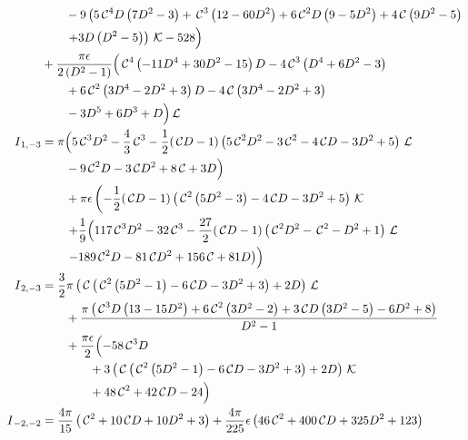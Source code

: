 \documentclass[prd,preprintnumbers,nofootinbib,superscriptaddress,onecolumn,preprint]{revtex4-1}
\newcommand\3[1]{\boldsymbol{#1}}
\newcommand{\cosfun}{\ensuremath{\mathcal{ \, C}}}
\newcommand{\llun}{\ensuremath{ \mathcal{\, L}}}
\newcommand{\kkun}{\ensuremath{ \mathcal{\, K}}}
\begin{document}
\begin{align}
                &{} \qquad  - 9 \left(5 \cosfun^4 D \left(7 D^2-3\right)+\cosfun^3 \left(12-60 D^2\right) + 6 \cosfun^2 D \left(9-5 D^2\right)+4 \cosfun \left(9 D^2-5\right)  \right. \nonumber \\  
                &{} \qquad \left. +3 D \left(D^2-5\right)\right) \kkun-528 \Bigr) \nonumber \\
                &{} +\frac{\pi  \epsilon}{2 \left(D^2-1\right)}  \Bigl( \cosfun^4 \left(-11 D^4+30 D^2-15\right) D-4 \cosfun^3 \left(D^4+6 D^2-3\right) \nonumber \\
                &{} \qquad +6 \cosfun^2 \left(3 D^4-2 D^2+3\right) D-4 \cosfun \left(3 D^4-2 D^2+3\right) \nonumber \\
                &{} \qquad -3 D^5+6 D^3+D \Bigr) \llun  \\ 
I{}_{1,-3}  &{} = \pi  \Bigl( 5 \cosfun^3 D^2-\frac{4}{3} \cosfun^3-\frac{1}{2} (\cosfun D-1) \left(5 \cosfun^2 D^2-3 \cosfun^2-4 \cosfun D-3 D^2+5\right) \llun \nonumber \\
                &{} \qquad -9 \cosfun^2 D-3 \cosfun D^2+8 \cosfun+3 D \Bigr) \nonumber \\ 
               &{} \qquad + \pi  \epsilon  \left(-\frac{1}{2} (\cosfun D-1) \left(\cosfun^2 \left(5 D^2-3\right)-4 \cosfun D-3 D^2+5\right) \kkun \right. \nonumber \\ 
               &{} \left. \qquad + \frac{1}{9} \Bigl( 117 \cosfun^3 D^2-32 \cosfun^3-\frac{27}{2} (\cosfun D-1) \left(\cosfun^2 D^2-\cosfun^2-D^2+1\right) \llun \right. \nonumber \\
               &{} \left. \qquad -189 \cosfun^2 D-81 \cosfun D^2+156 \cosfun+81 D\right) \Bigr)  \\
				  I{}_{2,-3}  &{} = \frac{3}{2} \pi  \left(\cosfun \left(\cosfun^2 \left(5 D^2-1\right)-6 \cosfun D-3 D^2+3\right)+2 D\right) \llun \nonumber \\
                &{} \qquad +\frac{\pi  \left(\cosfun^3 D \left(13-15 D^2\right)+6 \cosfun^2 \left(3 D^2-2\right)+3 \cosfun D \left(3 D^2-5\right)-6 D^2+8\right)}{D^2-1} \nonumber \\
                &{} \qquad + \frac{\pi \epsilon}{2} \Bigl( -58 \cosfun^3 D \nonumber \\ 
                &{} \qquad \qquad +3 \left(\cosfun \left(\cosfun^2 \left(5 D^2-1\right)-6 \cosfun D-3 D^2+3\right)+2 D\right) \kkun \nonumber \\
                &{} \qquad \qquad +48 \cosfun^2+42 \cosfun D-24\Bigr) \\
I{}_{-2,-2}  &{}= \frac{4 \pi}{15} \left( \cosfun^2+10 \cosfun D+10 D^2+3 \right) + \frac{4 \pi}{225} \epsilon  \left(46  \cosfun^2+400  \cosfun D+325 D^2+123 \right)  \\

\end{align}
\end{document}
